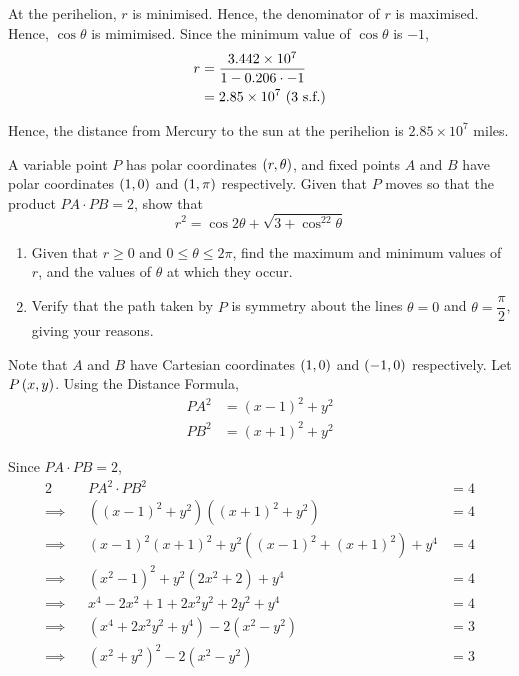 \documentclass{echw}
\begin{document}
        At the perihelion, $r$ is minimised. Hence, the denominator of $r$ is maximised. Hence, $\cos \theta$ is mimimised. Since the minimum value of $\cos \theta$ is $-1$,
        \begin{align*}
            r &= \dfrac{3.442 \times 10^7}{1 - 0.206\cdot-1}\\
            &= 2.85 \times 10^7 \text{ (3 s.f.)}
        \end{align*}

        Hence, the distance from Mercury to the sun at the perihelion is $2.85 \times 10^7$ miles.


    \problem{}
        A variable point $P$ has polar coordinates $\left(r, \theta\right)$, and fixed points $A$ and $B$ have polar coordinates $\left(1, 0\right)$ and $\left(1, \pi\right)$ respectively. Given that $P$ moves so that the product $PA\cdot PB = 2$, show that
        \begin{equation*}
            r^2 = \cos2\theta + \sqrt{3 + \cos^22\theta}
        \end{equation*}

        \begin{enumerate}
            \item Given that $r \geq 0$ and $0 \leq \theta \leq 2\pi$, find the maximum and minimum values of $r$, and the values of $\theta$ at which they occur.
            \item Verify that the path taken by $P$ is symmetry about the lines $\theta = 0$ and $\theta = \dfrac{\pi}{2}$, giving your reasons.
        \end{enumerate}

    \solution
        Note that $A$ and $B$ have Cartesian coordinates $\left(1, 0\right)$ and $\left(-1, 0\right)$ respectively. Let $P\left(x, y\right)$. Using the Distance Formula,
        \begin{align*}
            PA^2 &= (x-1)^2 + y^2\\
            PB^2 &= (x+1)^2 + y^2
        \end{align*}

        Since $PA \cdot PB = 2$,
        \begin{alignat*}{2}
            &&PA^2 \cdot PB^2 &= 4\\
            \implies&&\left((x-1)^2 + y^2\right)\left((x+1)^2 + y^2\right) &= 4\\
            \implies&&(x-1)^2(x+1)^2 + y^2\left((x-1)^2 + (x+1)^2\right) + y^4 &= 4\\
            \implies&&\left(x^2 - 1\right)^2 + y^2\left(2x^2 + 2\right) + y^4 &= 4\\
            \implies&&x^4 - 2x^2 + 1 + 2x^2y^2 + 2y^2 + y^4 &= 4\\
            \implies&&\left(x^4 + 2x^2y^2 + y^4\right) - 2\left(x^2 - y^2\right) &= 3\\
            \implies&&\left(x^2 + y^2\right)^2 - 2\left(x^2 - y^2\right) &= 3
        \end{alignat*}
\end{document}
